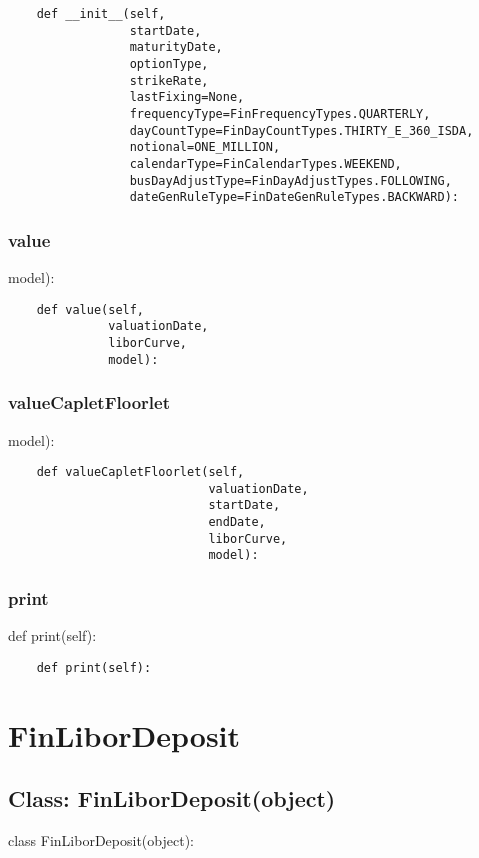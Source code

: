 \documentclass[twoside,11pt]{book}
\begin{document}
\begin{lstlisting}
    def __init__(self,
                 startDate,
                 maturityDate,
                 optionType,
                 strikeRate,
                 lastFixing=None,
                 frequencyType=FinFrequencyTypes.QUARTERLY,
                 dayCountType=FinDayCountTypes.THIRTY_E_360_ISDA,
                 notional=ONE_MILLION,
                 calendarType=FinCalendarTypes.WEEKEND,
                 busDayAdjustType=FinDayAdjustTypes.FOLLOWING,
                 dateGenRuleType=FinDateGenRuleTypes.BACKWARD):
\end{lstlisting}

\subsubsection*{{\bf value}}
model): 

\begin{lstlisting}
    def value(self,
              valuationDate,
              liborCurve,
              model):
\end{lstlisting}

\subsubsection*{{\bf valueCapletFloorlet}}
model): 

\begin{lstlisting}
    def valueCapletFloorlet(self,
                            valuationDate,
                            startDate,
                            endDate,
                            liborCurve,
                            model):
\end{lstlisting}

\subsubsection*{{\bf print}}
def print(self): 

\begin{lstlisting}
    def print(self):
\end{lstlisting}

\newpage
\section{FinLiborDeposit}

\subsection*{Class: FinLiborDeposit(object)}
class FinLiborDeposit(object): 
\end{document}
